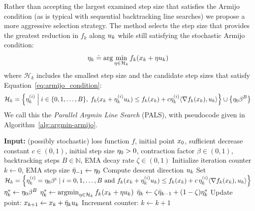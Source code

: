 Rather than accepting the largest examined step size that satisfies the Armijo condition (as is typical with sequential backtracking line searches) we propose a more aggressive selection strategy. The method selects the step size that provides the greatest reduction in $f_k$ along $u_{k}$ while still satisfying the stochastic Armijo condition:
\begin{equation}\label{eq_armijo_sgd}
    \eta_{k} \doteq \arg\min_{\eta \in \mathcal{H}_k} f_k(x_{k} + \eta u_{k})
\end{equation}
where $\mathcal{H}_k$ includes the smallest step size and the candidate step sizes that satisfy Equation~\ref{eq:armijo_condition}:
\begin{equation}
\mathcal{H}_k = \left\{ \eta_{k}^{(i)} \;\middle|\; i \in \{0, 1, \dots, B\},\;
  f_k(x_{k} + \eta_{k}^{(i)} u_{k}) \leq f_k(x_{k}) + c\eta_{k}^{(i)} \langle \nabla f_k(x_{k}), u_{k} \rangle \right\}
  \cup \left\{ \eta_0 \beta^B \right\}
    \label{eq:min_search}
\end{equation}
We call this the \textit{Parallel Argmin Line Search} (PALS), with pseudocode given in Algorithm~\ref{alg:argmin-armijo}.


\begin{algorithm}[htbp]
    \caption{Parallel Argmin Line Search (PALS)}
    \label{alg:argmin-armijo}
    \begin{algorithmic}[1]
        \State \textbf{Input:} (possibly stochastic) loss function $f$, initial point $x_{0}$, sufficient decrease constant $c \in (0, 1)$, initial step size $\eta_0 > 0$, contraction factor $\beta \in (0, 1)$, backtracking steps $B \in \mathbb{N}$, EMA decay rate $\zeta \in (0, 1)$
        \State Initialize iteration counter $k \gets 0$, EMA step size $\bar{\eta}_{-1} \gets \eta_0$
            \State Compute descent direction $u_{k}$ 
            \State Set $\mathcal{H}_k = \left\{
                \eta_{k}^{(i)} = \eta_0 \beta^{i} \mid i = 0, 1, \ldots, B \text{ and } f_k(x_{k} + \eta_{k}^{(i)} u_{k})
                \le f_k(x_{k}) + c\, \eta_{k}^{(i)} \langle \nabla f_k(x_{k}), u_{k} \rangle
            \right\}$
                \State $\eta_{k}^* \gets \eta_0 \beta^B$ 
            \Else
                \State $\eta_{k}^* \gets \operatorname*{argmin}_{\eta \in \mathcal{H}_k} f_k(x_{k} + \eta u_{k})$
            \EndIf
            \State $\bar{\eta}_k \gets \zeta \bar{\eta}_{k-1} + (1 - \zeta) \eta_{k}^*$ 
            \State Update point: $x_{k+1} \gets x_{k} + \bar{\eta}_k u_{k}$
            \State Increment counter: $k \gets k + 1$
        \EndFor
    \end{algorithmic}
    \end{algorithm}

